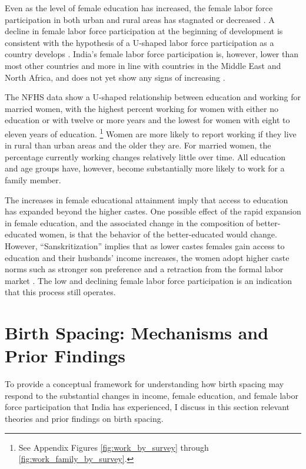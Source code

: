 \documentclass[12pt,letterpaper]{article}
\begin{document}
Even as the level of female education has increased, the female labor force participation 
in both urban and rural areas has stagnated or decreased
\citep{Klasen2015,Fletcher2017,Afridi2018,Bhargava2018,Chatterjee2018,Bhargava2019}.
A decline in female labor force participation at the beginning of development is
consistent with the hypothesis of a U-shaped labor force participation as a country
develops \citep{Goldin1994}.
India's female labor force participation is, however, lower than most other
countries and more in line with countries in the Middle East and North Africa, and
does not yet show any signs of increasing
\citep{Klasen2015,Chatterjee2018}.

The NFHS data show a U-shaped relationship between education and working for married
women, with the highest percent working for women with either no education 
or with twelve or more years and the lowest for women with eight to eleven years of 
education.%
\footnote{
See Appendix Figures \ref{fig:work_by_survey} through \ref{fig:work_family_by_survey}. 
}
Women are more likely to report working if they live in rural than urban areas 
and the older they are.
For married women, the percentage currently working changes relatively little over time. 
All education and age groups have, however, become substantially more likely to work for 
a family member.

The increases in female educational attainment imply that access to education has 
expanded beyond the higher castes. 
One possible effect of the rapid expansion in female education, and the 
associated change in the composition of better-educated women, is that the behavior
of the better-educated would change. 
However, ``Sanskritization'' implies that as lower castes females gain access to 
education and their husbands' income increases, the women adopt higher caste 
norms such as stronger son preference and a retraction from the formal labor 
market \citep{Srinivas1956,Chen1995,Abraham2013,Chatterjee2018}.
The low and declining female labor force participation is an indication that this
process still operates.


\section{Birth Spacing: Mechanisms and Prior Findings}

To provide a conceptual framework for understanding how birth spacing
may respond to the substantial changes in income, female education, and
female labor force participation that India has experienced, I discuss
in this section relevant theories and prior findings on birth spacing.
\end{document}
